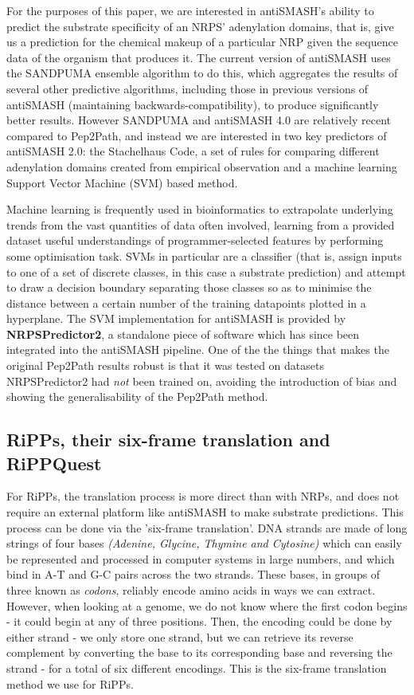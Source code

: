\documentclass{l4proj}
\newcommand{\cit}[1]{\citep{#1}}
\begin{document}
For the purposes of this paper, we are interested in antiSMASH's ability to predict the substrate specificity of an NRPS' adenylation domains, that is, give us a prediction for the chemical makeup of a particular NRP given the sequence data of the organism that produces it. The current version of antiSMASH uses the SANDPUMA ensemble algorithm to do this, which aggregates the results of several other predictive algorithms, including those in previous versions of antiSMASH (maintaining backwards-compatibility), to produce significantly better results. However SANDPUMA and antiSMASH 4.0 are relatively recent compared to Pep2Path, and instead we are interested in two key predictors of antiSMASH 2.0: the Stachelhaus Code, a set of rules for comparing different adenylation domains created from empirical observation \cit{stachelhaus} and a machine learning Support Vector Machine (SVM) based method.

Machine learning is frequently used in bioinformatics to extrapolate underlying trends from the vast quantities of data often involved, learning from a provided dataset useful understandings of programmer-selected features by performing some optimisation task. SVMs in particular are a classifier (that is, assign inputs to one of a set of discrete classes, in this case a substrate prediction) and attempt to draw a decision boundary separating those classes so as to minimise the distance between a certain number of the training datapoints plotted in a hyperplane. The SVM implementation for antiSMASH is provided by \textbf{NRPSPredictor2}, \cit{nrps2} a standalone piece of software which has since been integrated into the antiSMASH pipeline. One of the the things that makes the original Pep2Path results robust is that it was tested on datasets NRPSPredictor2 had \textit{not} been trained on, avoiding the introduction of bias and showing the generalisability of the Pep2Path method.

\subsection{RiPPs, their six-frame translation and RiPPQuest} \label{ripps}

For RiPPs, the translation process is more direct than with NRPs, and does not require an external platform like antiSMASH to make substrate predictions. This process can be done via the 'six-frame translation'. DNA strands are made of long strings of four bases \textit{(Adenine, Glycine, Thymine and Cytosine)} which can easily be represented and processed in computer systems in large numbers, and which bind in A-T and G-C pairs across the two strands. These bases, in groups of three known as \textit{codons}, reliably encode amino acids in ways we can extract. However, when looking at a genome, we do not know where the first codon begins - it could begin at any of three positions. Then, the encoding could be done by either strand - we only store one strand, but we can retrieve its reverse complement by converting the base to its corresponding base and reversing the strand - for a total of six different encodings. This is the six-frame translation method we use for RiPPs.
\end{document}
